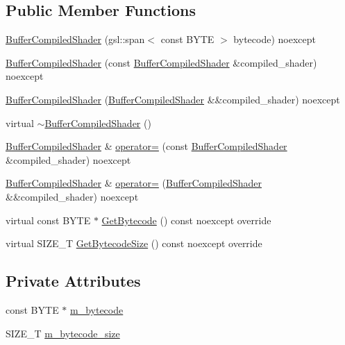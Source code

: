 \subsection*{Public Member Functions}
\begin{DoxyCompactItemize}
\item 
\hyperlink{classmage_1_1rendering_1_1_buffer_compiled_shader_ae2a2ce1b29d89125d6413ea9bf773694}{Buffer\+Compiled\+Shader} (gsl\+::span$<$ const B\+Y\+TE $>$ bytecode) noexcept
\item 
\hyperlink{classmage_1_1rendering_1_1_buffer_compiled_shader_a81aeb002f1a4a11b93f70fbeb34c5afc}{Buffer\+Compiled\+Shader} (const \hyperlink{classmage_1_1rendering_1_1_buffer_compiled_shader}{Buffer\+Compiled\+Shader} \&compiled\+\_\+shader) noexcept
\item 
\hyperlink{classmage_1_1rendering_1_1_buffer_compiled_shader_a15ec170bf2864c9dcfa13dff93231a71}{Buffer\+Compiled\+Shader} (\hyperlink{classmage_1_1rendering_1_1_buffer_compiled_shader}{Buffer\+Compiled\+Shader} \&\&compiled\+\_\+shader) noexcept
\item 
virtual \hyperlink{classmage_1_1rendering_1_1_buffer_compiled_shader_af989fa0356f17de9dd75b76aace3f106}{$\sim$\+Buffer\+Compiled\+Shader} ()
\item 
\hyperlink{classmage_1_1rendering_1_1_buffer_compiled_shader}{Buffer\+Compiled\+Shader} \& \hyperlink{classmage_1_1rendering_1_1_buffer_compiled_shader_a1f8eb13198c5bad8ebe55ae1ddf94769}{operator=} (const \hyperlink{classmage_1_1rendering_1_1_buffer_compiled_shader}{Buffer\+Compiled\+Shader} \&compiled\+\_\+shader) noexcept
\item 
\hyperlink{classmage_1_1rendering_1_1_buffer_compiled_shader}{Buffer\+Compiled\+Shader} \& \hyperlink{classmage_1_1rendering_1_1_buffer_compiled_shader_a0e11565292a427dff5b36ef7c26b6d08}{operator=} (\hyperlink{classmage_1_1rendering_1_1_buffer_compiled_shader}{Buffer\+Compiled\+Shader} \&\&compiled\+\_\+shader) noexcept
\item 
virtual const B\+Y\+TE $\ast$ \hyperlink{classmage_1_1rendering_1_1_buffer_compiled_shader_a0887622bd25db8698c572d0dc46167b9}{Get\+Bytecode} () const noexcept override
\item 
virtual S\+I\+Z\+E\+\_\+T \hyperlink{classmage_1_1rendering_1_1_buffer_compiled_shader_a235948a6ba0bcac698d6e35ce3504da2}{Get\+Bytecode\+Size} () const noexcept override
\end{DoxyCompactItemize}
\subsection*{Private Attributes}
\begin{DoxyCompactItemize}
\item 
const B\+Y\+TE $\ast$ \hyperlink{classmage_1_1rendering_1_1_buffer_compiled_shader_a6caa56491d81612c3eaec789d8e341bc}{m\+\_\+bytecode}
\item 
S\+I\+Z\+E\+\_\+T \hyperlink{classmage_1_1rendering_1_1_buffer_compiled_shader_a176f35c25e3a4de26b0334ffdc53da73}{m\+\_\+bytecode\+\_\+size}
\end{DoxyCompactItemize}
